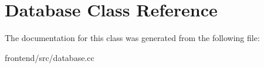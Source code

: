 \hypertarget{classDatabase}{\section{Database Class Reference}
\label{classDatabase}
}


The documentation for this class was generated from the following file\-:\begin{DoxyCompactItemize}
\item 
frontend/src/database.\-cc\end{DoxyCompactItemize}

